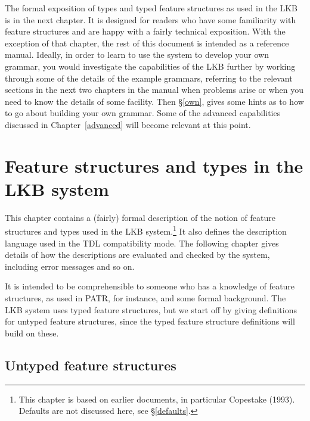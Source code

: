 \documentclass[12pt]{report}
\begin{document}
The formal exposition
of types and typed feature structures as used in the LKB is in the next chapter.
It is designed for readers
who have some familiarity with feature structures and are happy with
a fairly technical exposition.
With the exception of that chapter, the rest of this
document is intended as a reference manual.  Ideally, in order to learn 
to use the system
to develop your own grammar, you would investigate the capabilities 
of the LKB further
by working through some of the details of the example grammars,
referring to the relevant sections in the next two chapters in
the manual when problems arise or when you need to know the details of some
facility.  Then \S\ref{own}, gives some hints as to how to go about
building your own grammar.  Some of the advanced capabilities discussed in 
Chapter~\ref{advanced} will become relevant at this point.

\chapter{Feature structures and types in the LKB system}
\label{formal}

This chapter contains a (fairly) formal description of the notion of
feature structures and types used in the LKB system.\footnote{This chapter is based
on earlier documents, in particular Copestake (1993).  
Defaults are not discussed here, see \S\ref{defaults}.}
It also defines the description language used in the TDL compatibility mode. 
The following chapter gives details of how the descriptions are
evaluated and checked by the system, including error messages and so on.
 
It is intended to be comprehensible
to someone who has a knowledge
of feature structures, as used in PATR, for instance, and some
formal background.  The LKB system
uses typed feature structures, but we start off by giving definitions
for untyped feature structures, since the typed feature structure
definitions will build on these.

\section{Untyped feature structures}
\label{extvsint}
\end{document}
